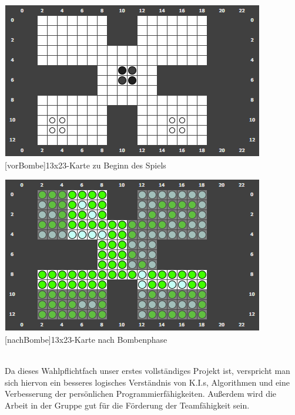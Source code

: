 \documentclass[12pt,a4paper,bibliography=totocnumbered,listof=totocnumbered,ngerman]{scrartcl}
\begin{document}
	\begin{minipage}[t]{0.45\linewidth}
        \centering
        \includegraphics[width=1\linewidth]{pics/gamefield03.png}\\
        [vorBombe]{13x23-Karte zu Beginn des Spiels}
        \label{fig:vorBombe}
    \end{minipage}
    \hfill
    \begin{minipage}[t]{0.45\linewidth}
        \centering
        \includegraphics[width=1\linewidth]{pics/gamefield03afterbombphase.png}\\
        [nachBombe]{13x23-Karte nach Bombenphase}
        \label{fig:nachBombe}
    \end{minipage}
\\

Da dieses Wahlpflichtfach unser erstes vollständiges Projekt ist, verspricht man sich hiervon ein besseres logisches Verständnis von K.I.s, Algorithmen und eine Verbesserung der persönlichen Programmierfähigkeiten. Außerdem wird die Arbeit in der Gruppe gut für die Förderung der Teamfähigkeit sein.
\end{document}
